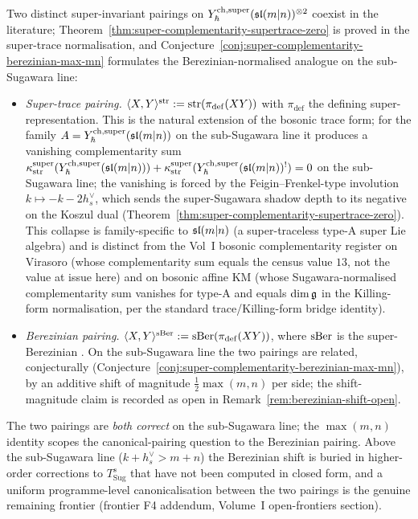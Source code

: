\begin{remark}
\label{rem:two-pairings-supertrace-berezinian}
Two distinct super-invariant pairings on
$Y^{\mathrm{ch},\mathrm{super}}_{\hbar}(\mathfrak{sl}(m|n))^{\otimes 2}$ coexist in the literature;
Theorem~\ref{thm:super-complementarity-supertrace-zero} is proved in
the super-trace normalisation, and
Conjecture~\ref{conj:super-complementarity-berezinian-max-mn}
formulates the Berezinian-normalised analogue on the sub-Sugawara
line:
\begin{itemize}
\item[(I)] \emph{Super-trace pairing.}
 $\langle X, Y\rangle^{\operatorname{str}} := \operatorname{str}(\pi_{\mathrm{def}}(XY))$ with
 $\pi_{\mathrm{def}}$ the defining super-representation. This is the
 natural extension of the bosonic trace form; for the family
 $A = Y^{\mathrm{ch},\mathrm{super}}_{\hbar}(\mathfrak{sl}(m|n))$ on the sub-Sugawara line it
 produces a vanishing complementarity sum
 $\kappa^{\mathrm{super}}_{\operatorname{str}}(Y^{\mathrm{ch},\mathrm{super}}_{\hbar}(\mathfrak{sl}(m|n))) +
 \kappa^{\mathrm{super}}_{\operatorname{str}}(Y^{\mathrm{ch},\mathrm{super}}_{\hbar}(\mathfrak{sl}(m|n))^{!})
 = 0$
 on the sub-Sugawara line; the vanishing is forced by the
 Feigin--Frenkel-type involution $k\mapsto -k-2h^{\vee}_{s}$, which
 sends the super-Sugawara shadow depth to its negative on the Koszul
 dual (Theorem~\ref{thm:super-complementarity-supertrace-zero}). This
 collapse is family-specific to $\mathfrak{sl}(m|n)$ (a super-traceless type-A
 super Lie algebra) and is distinct from the Vol~I bosonic complementarity
 register on Virasoro (whose complementarity sum equals the census
 value $13$, not the value at issue here) and on bosonic affine
 KM (whose Sugawara-normalised complementarity sum vanishes for
 type-A and equals $\dim\mathfrak{g}$ in the Killing-form normalisation,
 per the standard trace/Killing-form bridge identity).
\item[(II)] \emph{Berezinian pairing.}
 $\langle X, Y\rangle^{\operatorname{sBer}} := \operatorname{sBer}(\pi_{\mathrm{def}}(XY))$, where
 $\operatorname{sBer}$ is the super-Berezinian
 \cite{Berezin87}. On the sub-Sugawara line the two pairings are
 related, conjecturally
 (Conjecture~\ref{conj:super-complementarity-berezinian-max-mn}),
 by an additive shift of magnitude $\tfrac{1}{2}\max(m,n)$ per side;
 the shift-magnitude claim is recorded as open in
 Remark~\ref{rem:berezinian-shift-open}.
\end{itemize}
The two pairings are \emph{both correct} on the sub-Sugawara line; the
$\max(m,n)$ identity scopes the canonical-pairing question to the
Berezinian pairing. Above the sub-Sugawara line ($k+h^{\vee}_{s} >
m+n$) the Berezinian shift is buried in higher-order corrections to
$T_{\mathrm{Sug}}^{s}$ that have not been computed in closed form,
and a uniform programme-level canonicalisation between the two
pairings is the genuine remaining frontier (frontier F4
addendum, Volume~I open-frontiers section).
\end{remark}

